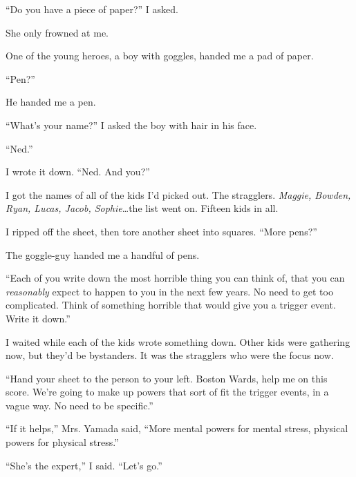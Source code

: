 ``Do you have a piece of paper?'' I asked.



She only frowned at me.



One of the young heroes, a boy with goggles, handed me a pad of paper.



``Pen?''



He handed me a pen.



``What's your name?'' I asked the boy with hair in his face.



``Ned.''



I wrote it down.  ``Ned.  And you?''



I got the names of all of the kids I'd picked out.  The stragglers.  \emph{Maggie, Bowden, Ryan, Lucas, Jacob, Sophie}\ldots the list went on.  Fifteen kids in all.



I ripped off the sheet, then tore another sheet into squares.  ``More pens?''



The goggle-guy handed me a handful of pens.



``Each of you write down the most horrible thing you can think of, that you can \emph{reasonably} expect to happen to you in the next few years.  No need to get too complicated.  Think of something horrible that would give you a trigger event.  Write it down.''



I waited while each of the kids wrote something down.  Other kids were gathering now, but they'd be bystanders.  It was the stragglers who were the focus now.



``Hand your sheet to the person to your left.  Boston Wards, help me on this score.  We're going to make up powers that sort of fit the trigger events, in a vague way.  No need to be specific.''



``If it helps,'' Mrs. Yamada said, ``More mental powers for mental stress, physical powers for physical stress.''



``She's the expert,'' I said.  ``Let's go.''



